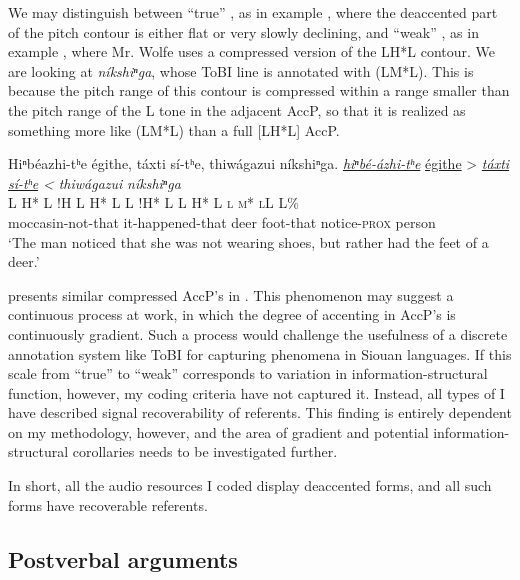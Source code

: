 \documentclass[output=paper]{LSP/langsci}
\begin{document}
We may distinguish between “true” , as in example , where the deaccented part of the pitch contour is either flat or very slowly declining, and “weak” , as in example , where Mr. Wolfe uses a compressed version of the LH*L contour. We are looking at \textit{níkshiⁿga}, whose ToBI line is annotated with (LM*L). This is because the pitch range of this contour is compressed within a range smaller than the pitch range of the L tone in the adjacent AccP, so that it is realized as something more like (LM*L) than a full [LH*L] AccP.

\ea\label{wolfeweakdeaccenting}
Hiⁿbéazhi-tʰe égithe, táxti sí-tʰe, thiwágazui níkshiⁿga.\footnotemark
\glll	\emph{\underline{hiⁿbé-ázhi-tʰe}}	{\underline{égithe} >}				\emph{\underline{táxti}}		\emph{\underline{sí-tʰe} <}		\emph{thiwágazui}	\emph{níkshiⁿga}\\
	{\ob L H* L}					{\cb{}!H}	{\ob L H* L\cb}			{\ob L !H* L\cb}				{\ob L H* L}			{\op \textsc{l m* l}\cp\cb{}L L\%}\\
	moccasin-not-that				it-happened-that					deer					foot-that				notice-\textsc{prox}		person\\
\glt	`The man noticed that she was not wearing shoes, but rather had the feet of a deer.'
\z

\citet[121--123]{Mirzayan2011} presents similar compressed AccP’s in . This phenomenon may suggest a continuous process at work, in which the degree of accenting in AccP’s is continuously gradient. Such a process would challenge the usefulness of a discrete annotation system like ToBI for capturing  phenomena in Siouan languages. If this scale from “true” to “weak”  corresponds to variation in information-structural function, however, my coding criteria have not captured it. Instead, all types of  I have described signal recoverability of referents. This finding is entirely dependent on my methodology, however, and the area of gradient  and potential information-structural corollaries needs to be investigated further.

In short, all the audio resources I coded display deaccented forms, and all such forms have recoverable referents.

\subsection{Postverbal arguments}\label{postverbalarguments}
\end{document}
